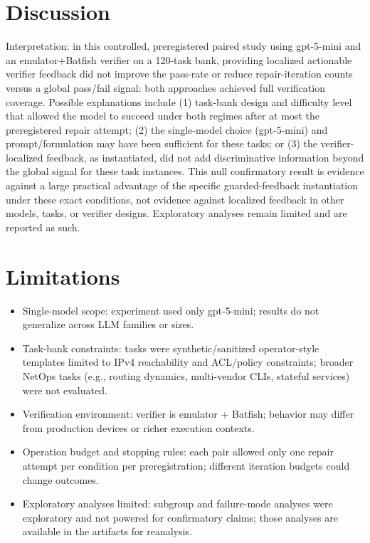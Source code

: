 \documentclass[conference]{IEEEtran}
\begin{document}
\section{Discussion}
Interpretation: in this controlled, preregistered paired study using gpt-5-mini and an emulator+Batfish verifier on a 120-task bank, providing localized actionable verifier feedback did not improve the pass-rate or reduce repair-iteration counts versus a global pass/fail signal: both approaches achieved full verification coverage. Possible explanations include (1) task-bank design and difficulty level that allowed the model to succeed under both regimes after at most the preregistered repair attempt; (2) the single-model choice (gpt-5-mini) and prompt/formulation may have been sufficient for these tasks; or (3) the verifier-localized feedback, as instantiated, did not add discriminative information beyond the global signal for these task instances. This null confirmatory result is evidence against a large practical advantage of the specific guarded-feedback instantiation under these exact conditions, not evidence against localized feedback in other models, tasks, or verifier designs. Exploratory analyses remain limited and are reported as such.

\section{Limitations}
\begin{itemize}
\item Single-model scope: experiment used only gpt-5-mini; results do not generalize across LLM families or sizes.
\item Task-bank constraints: tasks were synthetic/sanitized operator-style templates limited to IPv4 reachability and ACL/policy constraints; broader NetOps tasks (e.g., routing dynamics, multi-vendor CLIs, stateful services) were not evaluated.
\item Verification environment: verifier is emulator + Batfish; behavior may differ from production devices or richer execution contexts.
\item Operation budget and stopping rules: each pair allowed only one repair attempt per condition per preregistration; different iteration budgets could change outcomes.
\item Exploratory analyses limited: subgroup and failure-mode analyses were exploratory and not powered for confirmatory claims; those analyses are available in the artifacts for reanalysis.
\end{itemize}
\end{document}
